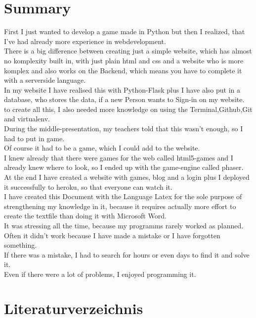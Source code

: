\documentclass{article}
\begin{document}
\section{Summary}
First I just wanted to develop a game made in Python but then I realized,
that I've had already more experience in webdevelopment.\\
There is a big difference between creating just a simple website, which has almost no komplexity built in,
with just plain html and css and a website who is more komplex and also works on the Backend, which means you have to complete it with a
serverside language.\\
In my website I have realised this with Python-Flask plus I have also put in a database, who stores the data, if a new Person wants to Sign-in
on my website.\\
to create all this, I also needed more knowledge on using the Terminal,Github,Git and virtualenv.\\
During the middle-presentation, my teachers told that this wasn't enough, so I had to put in game.\\
Of course it had to be a game, which I could add to the website.\\
I knew already that there were games for the web called html5-games and I already knew where to look, so I ended up with the game-engine called phaser.\\
At the end I have created a website with games, blog and a login plus I deployed it successfully to heroku, so that everyone can watch it.\\
I have created this Document with the Language Latex for the sole purpose of strengthening my knowledge in it, because it requires actually more effort
to create the textfile than doing it with Microsoft Word.\\
It was stressing all the time, because my programms rarely worked as planned.\\
Often it didn't work because I have made a mistake or I have forgotten something.\\
If there was a mistake, I had to search for hours or even days to find it and solve it.\\
Even if there were a lot of problems, I enjoyed programming it.\\

\cleardoublepage




\section{Literaturverzeichnis}
\end{document}
